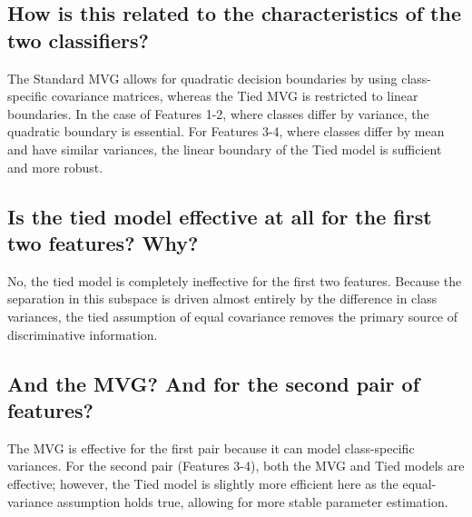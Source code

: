 \subsection*{How is this related to the characteristics of the two classifiers?}
The Standard MVG allows for quadratic decision boundaries by using class-specific covariance matrices, whereas the Tied MVG is restricted to linear boundaries. 
In the case of Features 1-2, where classes differ by variance, the quadratic boundary is essential. For Features 3-4, where classes differ by mean and have similar variances, the linear boundary of the Tied model is sufficient and more robust.

\subsection*{Is the tied model effective at all for the first two features? Why?}
No, the tied model is completely ineffective for the first two features. Because the separation in this subspace is driven almost entirely by the difference in class variances, the tied assumption of equal covariance removes the primary source of discriminative information.

\subsection*{And the MVG? And for the second pair of features?}
The MVG is effective for the first pair because it can model class-specific variances. For the second pair (Features 3-4), both the MVG and Tied models are effective; however, the Tied model is slightly more efficient here as the equal-variance assumption holds true, allowing for more stable parameter estimation.